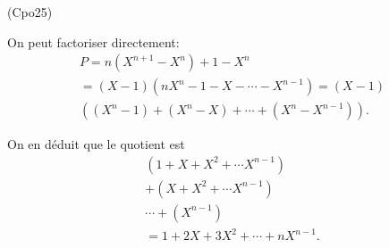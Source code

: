 \begin{tiny}(Cpo25)\end{tiny} On peut factoriser directement:
\begin{multline*}
  P = n(X^{n+1} - X^n) + 1 - X^n \\
  =(X-1)\left(nX^n - 1 - X - \cdots - X^{n-1} \right)
  =(X-1)\\\left((X^n - 1) + (X^n - X) + \cdots  +(X^n- X^{n-1}) \right).
\end{multline*}

On en déduit que le quotient est
\begin{multline*}
  (1 + X + X^2 + \cdots X^{n-1})\\
  + (X + X^2 + \cdots X^{n-1})\\
  \cdots + (X^{n-1}) \\
  = 1 + 2X + 3X^2 + \cdots + nX^{n-1}.
\end{multline*}
